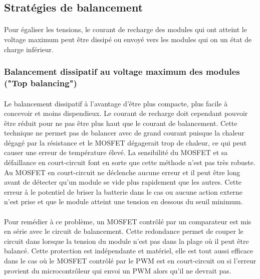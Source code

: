 


\subsection*{Stratégies de balancement}
\paragraph*{}
Pour égaliser les tensions, le courant de recharge des modules qui ont atteint le voltage maximum peut être dissipé ou envoyé vers les modules qui on un état de charge inférieur. 

\subsubsection*{Balancement dissipatif au voltage maximum des modules ("Top balancing")}
\paragraph*{}
Le balancement dissipatif à l'avantage d'être plus compacte, plus facile à concevoir et moins dispendieux. Le courant de recharge doit cependant pouvoir être réduit pour ne pas être plus haut que le courant de balancement. Cette technique ne permet pas de balancer avec de grand courant puisque la chaleur dégagé par la résistance et le MOSFET dégagerait trop de chaleur, ce qui peut causer une erreur de température élevé. La sensibilité du MOSFET et sa défaillance en court-circuit font en sorte que cette méthode n'est pas très robuste. Au MOSFET en court-circuit ne déclenche aucune erreur et il peut être long avant de détecter qu'un module se vide plus rapidement que les autres. Cette erreur à le potentiel de briser la batterie dans le cas ou aucune action externe n'est prise et que le module atteint une tension en dessous du seuil minimum.

\paragraph*{}
Pour remédier à ce problème, un MOSFET contrôlé par un comparateur est mis en série avec le circuit de balancement. Cette redondance permet de couper le circuit dans lorsque la tension du module n'est pas dans la plage où il peut être balancé. Cette protection est indépendante et matériel, elle est tout aussi efficace dans le cas où le MOSFET contrôlé par le PWM est en court-circuit ou si l'erreur provient du microcontrôleur qui envoi un PWM alors qu'il ne devrait pas.

